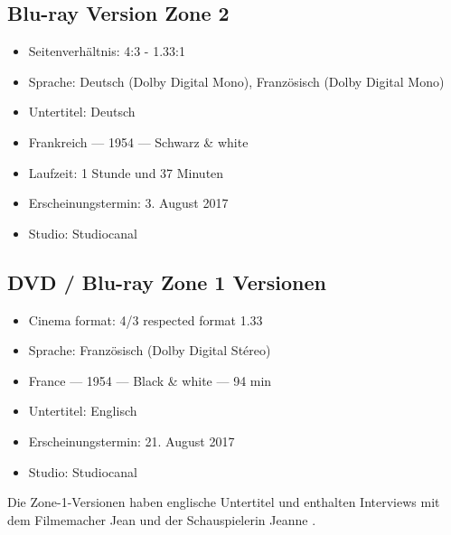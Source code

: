 \subsection*{Blu-ray Version Zone 2}

\begin{itemize}\itemsep=-3pt
	\item Seitenverhältnis: 4:3 - 1.33:1
	\item Sprache: Deutsch (Dolby Digital Mono), Französisch (Dolby Digital Mono)
	\item Untertitel: Deutsch
	\item Frankreich --- 1954 --- Schwarz \& white
	\item Laufzeit: 1 Stunde und 37 Minuten
	\item Erscheinungstermin: 3. August 2017
	\item Studio: Studiocanal
\end{itemize}

\subsection*{DVD / Blu-ray Zone 1 Versionen}

\begin{itemize}\itemsep=-3pt
	\item Cinema format: 4/3 respected format 1.33
	\item Sprache: Französisch (Dolby Digital Stéreo)
	\item France --- 1954 --- Black \& white --- 94 min
	\item Untertitel: Englisch
	\item Erscheinungstermin: 21. August 2017
	\item Studio: Studiocanal
\end{itemize}

Die Zone-1-Versionen haben englische Untertitel und enthalten Interviews mit dem Filmemacher Jean  und der Schauspielerin Jeanne .
